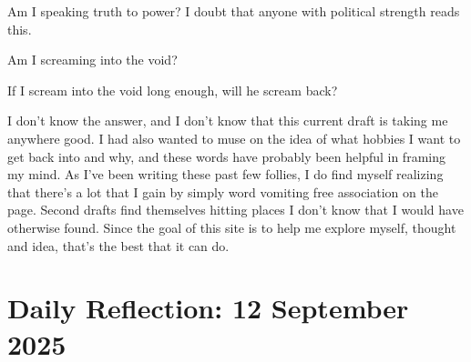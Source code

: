 \documentclass[12pt]{article}
\renewcommand{\,}{\textsuperscript{,}}
\begin{document}
Am I speaking truth to power?  
I doubt that anyone with political strength reads this.

Am I screaming into the void?

If I scream into the void long enough, will he scream back?

I don't know the answer, and I don't know that this current draft is taking me anywhere good.  
I had also wanted to muse on the idea of what hobbies I want to get back into and why, and these words have probably been helpful in framing my mind.  
As I've been writing these past few follies, I do find myself realizing that there's a lot that I gain by simply word vomiting free association on the page.  
Second drafts find themselves hitting places I don't know that I would have otherwise found.  
Since the goal of this site is to help me explore myself, thought and idea, that's the best that it can do.

\section{Daily Reflection: 12 September 2025}
\end{document}
